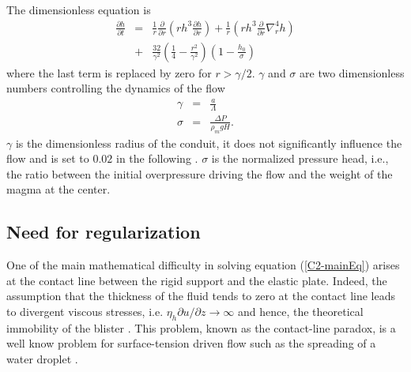 The dimensionless equation is
\begin{eqnarray}
  \frac{\partial h}{\partial t}& =&\frac{1}{ r}
                                    \frac{\partial}{\partial r}  \left( rh^3  \frac{\partial h}{\partial
                                    r}\right)+\frac{1}{ r} \left( rh^3
                                    \frac{\partial}{\partial
                                    r}\nabla_r^4h\right)\nonumber\\
                               &+&
                                   \frac{32}{\gamma^{2}}\left(\frac{1}{4}-\frac{r^{2}}{\gamma^{2}}\right)\left(1-\frac{h_0}{\sigma}\right)
                                   \label{C2-mainEq}
\end{eqnarray}
where the last term is replaced by zero for $r>\gamma/2$. $\gamma$ and
$\sigma$ are two dimensionless numbers controlling the dynamics of the
flow
\begin{eqnarray}
  \gamma &=& \frac{a}{\Lambda}\\
  \sigma &=& \frac{\Delta P}{\rho_m g H}.
\end{eqnarray}
$\gamma$  is the  dimensionless radius  of  the conduit,  it does  not
significantly influence the flow and is set to $0.02$ in the following
\citep{Michaut:2009jx,Michaut:2011kg}.   $\sigma$  is  the  normalized
pressure  head,  i.e.,  the  ratio between  the  initial  overpressure
driving the flow and the weight of the magma at the center.
	 
\subsection{Need for regularization}
\label{C2-sec:need-regularization}

One  of   the  main   mathematical  difficulty  in   solving  equation
(\ref{C2-mainEq}) arises at the contact line between the rigid support
and the elastic  plate.  Indeed, the assumption that  the thickness of
the fluid tends to zero at the contact line leads to divergent viscous
stresses, i.e.   $\eta_h \partial u/\partial z\rightarrow  \infty$ and
hence,     the    theoretical     immobility     of    the     blister
\citep{Flitton:1999iv,Lister:2013ia,Anonymous:QWXp_4JV}. This problem,
known  as  the  contact-line  paradox,  is a  well  know  problem  for
surface-tension driven flow  such as the spreading of  a water droplet
\citep{Bertozzi:1998wz,Snoeijer:2013cm}.

